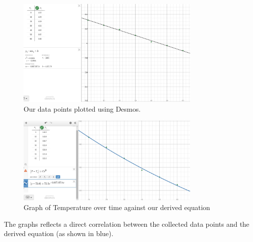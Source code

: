 \documentclass{article}
\begin{document}
\begin{figure}[t]
\centering
\includegraphics[width=0.8\textwidth]{graph.jpg}
\caption{Our data points plotted using Desmos.}
    \label{fig:my_label}
\end{figure}

\begin{figure}[h]
    \centering
    \includegraphics[width=0.8\textwidth]{Tvst.jpg}
    \caption{Graph of Temperature over time against our derived equation}
    \label{fig:my_label}
\end{figure}

The graphs reflects a direct correlation between the collected data points and the derived equation (as shown in blue).

\newpage
\end{document}
